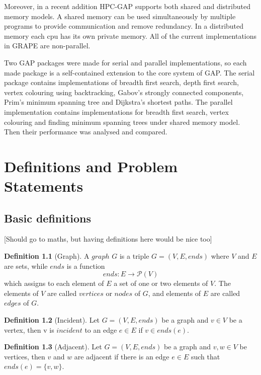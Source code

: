 \documentclass{report}
\theoremstyle{plain}
\theoremstyle{definition}
\newtheorem{definition}{Definition}
\theoremstyle{remark}
\begin{document}
Moreover, in a recent addition HPC-GAP supports both shared and distributed memory models. A shared memory can be used simultaneously by multiple programs to provide communication and remove redundancy. In a distributed memory each cpu has its own private memory. All of the current implementations in GRAPE are non-parallel.

Two GAP packages were made for serial and parallel implementations, so each made package is a self-contained extension to the core system of GAP. The serial package contains implementations of breadth first search, depth first search, vertex colouring using backtracking, Gabov's strongly connected components, Prim's minimum spanning tree and Dijkstra's shortest paths. The parallel implementation contains implementations for breadth first search, vertex colouring and finding minimum spanning trees under shared memory model. Then their performance was analysed and compared.

\chapter{Definitions and Problem Statements}

\section*{Basic definitions}

[Should go to maths, but having definitions here would be nice too]

\begin{definition}[Graph]
A $graph$  $G$ is a triple $G = (V, E, ends)$ where $V$ and $E$ are sets, while $ends$ is a function 
  \begin{equation}
  ends:E\to \mathcal P \left({V}\right)
  \end{equation}
which assigns to each element of $E$ a set of one or two elements of $V$. The elements of $V$ are called $vertices$ or $nodes$ of $G$, and elements of $E$ are called $edges$ of $G$.
\end{definition}

\begin{definition}[Incident]
Let $G = (V, E, ends)$ be a graph and $v\in V$ be a vertex, then v is $incident$ to an edge $e \in E$ if $v \in ends(e)$.
\end{definition}

\begin{definition}[Adjacent]
Let $G = (V, E, ends)$ be a graph and $v,w\in V$ be vertices, then $v$ and $w$ are adjacent if there is an edge $ e \in E$ such that $ends(e) = \{v, w\}$.
\end{definition}
\end{document}
